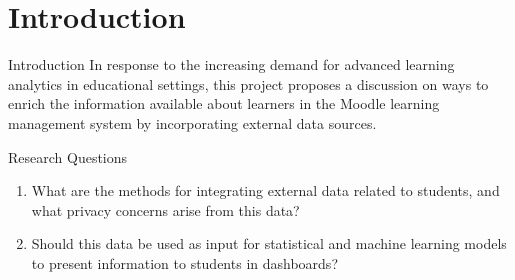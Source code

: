 \section{Introduction}

\begin{frame}{Introduction}
    In response to the increasing demand for advanced learning analytics in educational settings, this project proposes a discussion on ways to enrich the information available about learners in the Moodle learning management system by incorporating external data sources.
    \cite{byron2012usingdrupal}
\end{frame}

\begin{frame}{Research Questions}
    \begin{enumerate}[<+-|alert@+>]\color{gray}
        \item What are the methods for integrating external data related to students, and what privacy concerns arise from this data?
        \item Should this data be used as input for statistical and machine learning models to present information to students in dashboards?
    \end{enumerate}
\end{frame}